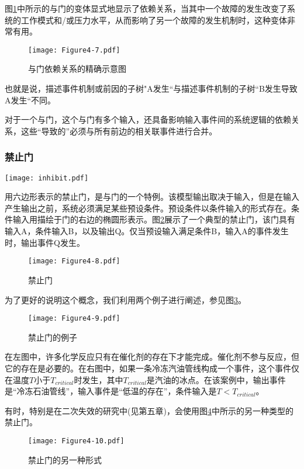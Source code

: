 \documentclass[cn,11pt,chinese]{elegantbook}
\begin{document}
图\ref{fig:fig4_7}中所示的与门的变体显式地显示了依赖关系，当其中一个故障的发生改变了系统的工作模式和/或压力水平，从而影响了另一个故障的发生机制时，这种变体非常有用。

\begin{figure}[h]
	\centering
	\texttt{[image: Figure4-7.pdf]}
	\caption{与门依赖关系的精确示意图}\label{fig:fig4_7}
\end{figure}


也就是说，描述事件机制或前因的子树"A发生“与描述事件机制的子树“B发生导致A发生“不同。

对于一个与门，这个与门有多个输入，还具备影响输入事件间的系统逻辑的依赖关系，这些“导致的”必须与所有前边的相关联事件进行合并。

\subsubsection{禁止门}

\texttt{[image: inhibit.pdf]}

用六边形表示的禁止门，是与门的一个特例。该模型输出取决于输入，但是在输入产生输出之前，系统必须满足某些预设条件。预设条件以条件输入的形式存在。条件输入用描绘于门的右边的椭圆形表示。图\ref{fig:fig4_8}展示了一个典型的禁止门，该门具有输入A，条件输入B，以及输出Q。仅当预设输入满足条件B，输入A的事件发生时，输出事件Q发生。

\begin{figure}[H]
	\centering
	\texttt{[image: Figure4-8.pdf]}
	\caption{禁止门}\label{fig:fig4_8}
\end{figure}

为了更好的说明这个概念，我们利用两个例子进行阐述，参见图\ref{fig:fig4_9}。

\begin{figure}[H]
	\centering
	\texttt{[image: Figure4-9.pdf]}
	\caption{禁止门的例子}\label{fig:fig4_9}
\end{figure}

在左图中，许多化学反应只有在催化剂的存在下才能完成。催化剂不参与反应，但它的存在是必要的。在右图中，如果一条冷冻汽油管线构成一个事件，这个事件仅在温度$T$小于$T_{critical}$时发生，其中$T_{critical}$是汽油的冰点。在该案例中，输出事件是“冷冻石油管线”，输入事件是“低温的存在”，条件输入是$T<T_{critical}$。

有时，特别是在二次失效的研究中(见第五章)，会使用图\ref{fig:fig4_10}中所示的另一种类型的禁止门。

\begin{figure}[H]
	\centering
	\texttt{[image: Figure4-10.pdf]}
	\caption{禁止门的另一种形式}\label{fig:fig4_10}
\end{figure}
\end{document}
